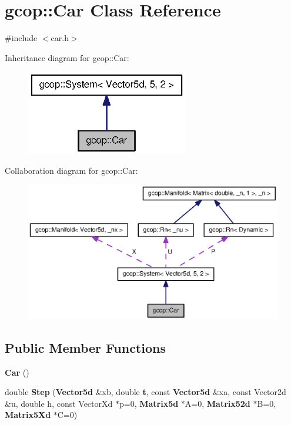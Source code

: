\section{gcop\-:\-:\-Car \-Class \-Reference}
\label{classgcop_1_1Car}


{\ttfamily \#include $<$car.\-h$>$}



\-Inheritance diagram for gcop\-:\-:\-Car\-:\nopagebreak
\begin{figure}[H]
\begin{center}
\leavevmode
\includegraphics[width=200pt]{classgcop_1_1Car__inherit__graph}
\end{center}
\end{figure}


\-Collaboration diagram for gcop\-:\-:\-Car\-:\nopagebreak
\begin{figure}[H]
\begin{center}
\leavevmode
\includegraphics[width=350pt]{classgcop_1_1Car__coll__graph}
\end{center}
\end{figure}
\subsection*{\-Public \-Member \-Functions}
\begin{DoxyCompactItemize}
\item 
{\bf \-Car} ()
\item 
double {\bf \-Step} ({\bf \-Vector5d} \&xb, double {\bf t}, const {\bf \-Vector5d} \&xa, const \-Vector2d \&u, double h, const \-Vector\-Xd $\ast$p=0, {\bf \-Matrix5d} $\ast$\-A=0, {\bf \-Matrix52d} $\ast$\-B=0, {\bf \-Matrix5\-Xd} $\ast$\-C=0)
\end{DoxyCompactItemize}
